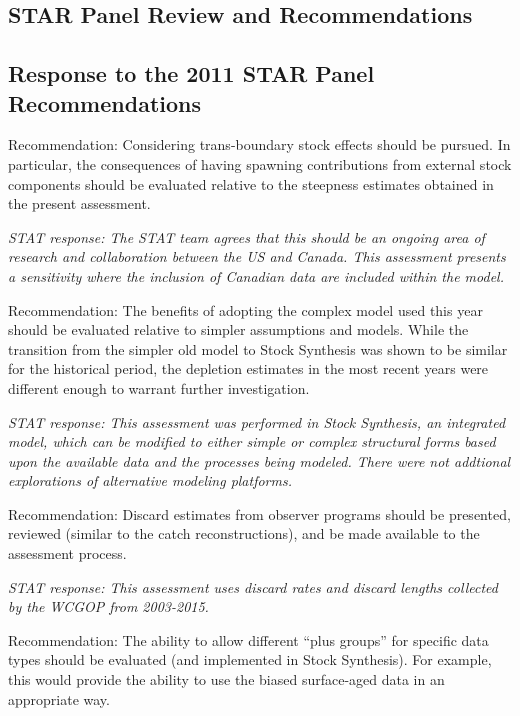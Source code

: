 \documentclass[12pt,]{article}
\begin{document}
\subsection{STAR Panel Review and
Recommendations}\label{star-panel-review-and-recommendations}

\subsection{Response to the 2011 STAR Panel
Recommendations}\label{response-to-the-2011-star-panel-recommendations}

Recommendation: Considering trans-boundary stock effects should be
pursued. In particular, the consequences of having spawning
contributions from external stock components should be evaluated
relative to the steepness estimates obtained in the present assessment.

\emph{STAT response: The STAT team agrees that this should be an ongoing
area of research and collaboration between the US and Canada. This
assessment presents a sensitivity where the inclusion of Canadian data
are included within the model.}

Recommendation: The benefits of adopting the complex model used this
year should be evaluated relative to simpler assumptions and models.
While the transition from the simpler old model to Stock Synthesis was
shown to be similar for the historical period, the depletion estimates
in the most recent years were different enough to warrant further
investigation.

\emph{STAT response: This assessment was performed in Stock Synthesis,
an integrated model, which can be modified to either simple or complex
structural forms based upon the available data and the processes being
modeled. There were not addtional explorations of alternative modeling
platforms.}

Recommendation: Discard estimates from observer programs should be
presented, reviewed (similar to the catch reconstructions), and be made
available to the assessment process.

\emph{STAT response: This assessment uses discard rates and discard
lengths collected by the WCGOP from 2003-2015.}

Recommendation: The ability to allow different ``plus groups'' for
specific data types should be evaluated (and implemented in Stock
Synthesis). For example, this would provide the ability to use the
biased surface-aged data in an appropriate way.
\end{document}
